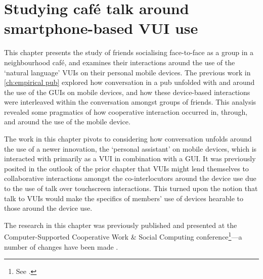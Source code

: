 


\chapter{Studying caf\'{e} talk around smartphone-based VUI use}\label{ch:empirical cafe}



\begin{revisedsubmission}
This chapter presents the study of friends socialising face-to-face as a group in a neighbourhood caf\'{e}, and examines their interactions around the use of the `natural language' \acfp{VUI} on their personal mobile devices.
The previous work in \autoref{ch:empirical pub} explored how conversation in a pub unfolded with and around the use of the \acfp{GUI} on mobile devices, and how these device-based interactions were interleaved within the conversation amongst groups of friends.
This analysis revealed some pragmatics of how cooperative interaction occurred in, through, and around the use of the mobile device.

The work in this chapter pivots to considering how conversation unfolds around the use of a newer innovation, the `personal assistant' on mobile devices, which is interacted with primarily as a \ac{VUI} in combination with a \ac{GUI}.
It was previously posited in the outlook of the prior chapter that \acp{VUI} might lend themselves to collaborative interactions amongst the co-interlocutors around the device use due to the use of talk over touchscreen interactions.
This turned upon the notion that talk to \acp{VUI} would make the specifics of members' use of devices hearable to those around the device use.
\end{revisedsubmission}

The research in this chapter was previously published and presented at the Computer-Supported Cooperative Work \& Social Computing conference\footnote{See \citet{Porcheron2017}.}---a number of changes have been made .

